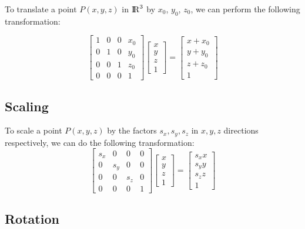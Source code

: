 \documentclass[12pt]{article}
\begin{document}
	To translate a point $P(x,y,z)$ in ${\rm I\!R}^3$ by $x_0$, $y_0$, $z_0$, we can perform the following transformation:

\begin{equation}
	\begin{bmatrix}
		1 & 0 & 0 & x_0 \\
		0 & 1 & 0 & y_0 \\
		0 & 0 & 1 & z_0 \\
		0 & 0 & 0 & 1  
	\end{bmatrix} 
	\begin{bmatrix}
		x \\ y \\ z \\ 1
	\end{bmatrix}  = 
	\begin{bmatrix}
		x + x_0 \\ y + y_0 \\ z + z_0 \\ 1
	\end{bmatrix}
\end{equation}	 

\subsection{Scaling}

	To scale a point $P(x,y,z)$ by the factors $ s_x, s_y, s_z $ in $x,y,z$ directions respectively, we can do the following transformation:
\begin{equation}
	\begin{bmatrix}
	s_x & 0 & 0 & 0 \\
	0 & s_y & 0 & 0 \\
	0 & 0 & s_z & 0 \\
	0 & 0 & 0 & 1  
	\end{bmatrix}
	\begin{bmatrix}
	x \\ y \\ z \\ 1
	\end{bmatrix} = 
	\begin{bmatrix}
	s_x x \\ s_y y \\ s_z z \\ 1
	\end{bmatrix}
\end{equation}

\subsection{Rotation}
	
\end{document}
